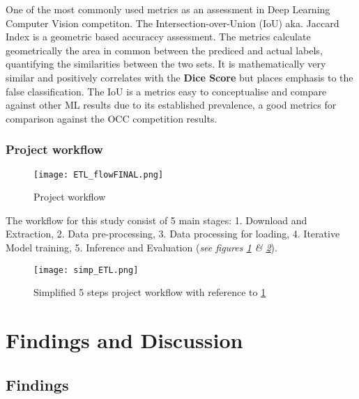 \documentclass[11pt, a4paper, twoside]{report}
\begin{document}
One of the most commonly used metrics as an assessment in Deep Learning Computer Vision competiton. The Intersection-over-Union (IoU) aka. Jaccard Index is a geometric based accuraccy assessment. The metrics calculate geometrically the area in common between the prediced and actual labels, quantifying the similarities between the two sets. It is mathematically very similar and positively correlates with the \textbf{Dice Score} but places emphasis to the false classification. The IoU is a metrics easy to conceptualise and compare against other ML results due to its established prevalence, a good metrics for comparison against the OCC competition results.\\\par

\subsection{Project workflow}\label{ProjWorkflow}

\begin{figure}[H]
  \centering
  \texttt{[image: ETL\_flowFINAL.png]}
  \caption{Project workflow}
  \label{fig:ETL_flow}
\end{figure}

The workflow for this study consist of 5 main stages: 1. Download and Extraction, 2. Data pre-processing, 3. Data processing for loading, 4. Iterative Model training, 5. Inference and Evaluation (\textit{see figures \ref{fig:ETL_flow} \& \ref{fig:simp_ETL}}).

\begin{figure}[H]
  \centering
  \texttt{[image: simp\_ETL.png]}
  \caption{Simplified 5 steps project workflow with reference to \ref{fig:ETL_flow}}
  \label{fig:simp_ETL}
\end{figure}

\newpage

\chapter{Findings and Discussion}\label{find&discuss}

\section{Findings}\label{Findings}
\end{document}
